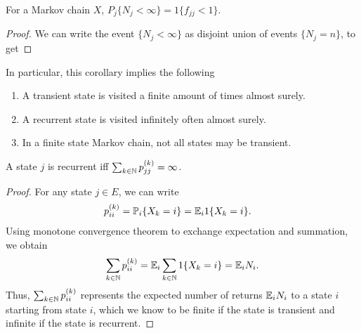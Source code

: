 \documentclass[a4paper,10pt,english]{article}
\begin{document}
\begin{cor} 
For a Markov chain $X$, 
$P_j\{N_j < \infty\} = 1\{f_{jj} < 1\}$. 
\end{cor}
\begin{proof}
We can write the event $\{N_j < \infty\}$ as disjoint union of events $\{N_j = n\}$, to get 
\end{proof}
In particular, this corollary implies the following
\begin{enumerate}
	\item A transient state is visited a finite amount of times almost surely.
	\item A recurrent state is visited infinitely often almost surely.
	\item In a finite state Markov chain, not all states may be transient. 
\end{enumerate} 
\begin{prop}
A state $j$ is recurrent iff
$\sum_{k\in\mathbb{N}} p_{jj}^{(k)} = \infty$.
\end{prop}
\begin{proof}
For any state $j \in E$, we can write
\begin{align*}
p_{ii}^{(k)} &= \mathbb{P}_i\{X_k=i\} = \mathbb{E}_i 1\{X_k=i\}.
\end{align*}
Using monotone convergence theorem to exchange expectation and summation, we obtain  
\begin{align*}
\sum_{k\in \mathbb{N}}p_{ii}^{(k)}=\mathbb{E}_i \sum_{k\in\mathbb{N}}1\{X_k=i\} = \mathbb{E}_i N_i.
\end{align*}
Thus, $\sum_{k\in \mathbb{N}} p_{ii}^{(k)}$ represents the expected number of returns $\mathbb{E}_i N_i$ to a state $i$ starting from state $i$, 
which we know to be finite if the state is transient and infinite if the state is recurrent. 
%
\end{proof}
\end{document}
